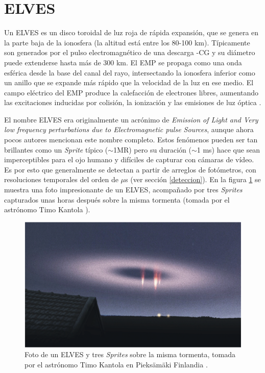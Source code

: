 \documentclass[11pt,oneside,openany,letter]{book}
\begin{document}
\section{ELVES}
Un ELVES es un disco toroidal de luz roja de rápida expansión, que se genera en la parte baja de la ionosfera (la altitud está entre los 80-100 km). Típicamente son generados por el pulso electromagnético de una descarga -CG y su diámetro puede extenderse hasta más de 300 km. El EMP se propaga como una onda esférica desde la base del canal del rayo, intersectando la ionosfera inferior como un anillo que se expande más rápido que la velocidad de la luz en ese medio. El campo eléctrico del EMP produce la calefacción de electrones libres, aumentando las excitaciones inducidas por colisión, la ionización y las emisiones de luz óptica \cite{FullekrugEtal2006}.

El nombre ELVES era originalmente un acrónimo de \textit{Emission of Light and Very low frequency perturbations due to Electromagnetic pulse Sources}, aunque ahora pocos autores mencionan este nombre completo. Estos fenómenos pueden ser tan brillantes como un \textit{Sprite} típico ($\sim$1MR) pero su duración ($\sim$1 ms) hace que sean imperceptibles para el ojo humano y difíciles de capturar con cámaras de vídeo. Es por esto que generalmente se detectan a partir de arreglos de fotómetros, con resoluciones temporales del orden de $\mu$s \cite{MussaCiaccio2012} (ver sección \ref{deteccion}). En la figura \ref{fig:elves_photo} se muestra una foto impresionante de un ELVES, acompañado por tres \textit{Sprites} capturados unas horas despu\'es sobre la misma tormenta (tomada por el astrónomo Timo Kantola \cite{makela2010}). 

\begin{figure}
    \centering
    \includegraphics[scale=0.65]{figures/elves_photo.png}
    \caption[Foto de un ELVES tomada por el astrónomo Timo Kantola]{Foto de un ELVES y tres \textit{Sprites} sobre la misma tormenta, tomada por el astrónomo Timo Kantola en Pieksämäki Finlandia \cite{makela2010}.}
    \label{fig:elves_photo}
\end{figure} 
\end{document}
